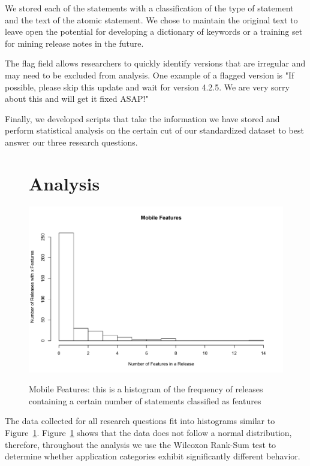 \documentclass{acm_proc_article-sp}
\begin{document}
We stored each of the statements with a classification of the type of statement and the text of the atomic statement.
We chose to maintain the original text to leave open the potential for developing a dictionary of keywords or a training set for mining release notes in the future.

The flag field allows researchers to quickly identify versions that are irregular and may need to be excluded from analysis.
One example of a flagged version is "If possible, please skip this update and wait for version 4.2.5. We are very sorry about this and will get it fixed ASAP!"

Finally, we developed scripts that take the information we have stored and perform statistical analysis on the certain cut of our standardized dataset to best answer our three research questions.

\begin{figure}


\section{Analysis}
	\label{sec:analysis}

\begin{center}
\includegraphics[width=.5\textwidth]{mobileFeaturesHist.pdf}
\label{fig:mobHist}
\caption{Mobile Features: this is a histogram of the frequency of releases containing a certain number of statements classified as features}
\end{center}
\end{figure}


The data collected for all research questions fit into histograms similar to Figure~\ref{fig:mobHist}. 
Figure~\ref{fig:mobHist} shows that the data does not follow a normal distribution, therefore, throughout the analysis we use the Wilcoxon Rank-Sum test to determine whether application categories exhibit significantly different behavior.
\end{document}
